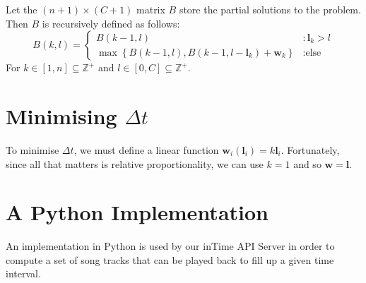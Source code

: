 \documentclass[11pt]{article}
\begin{document}
Let the $(n+1) \times (C+1)$ matrix $B$ store the partial solutions to the problem. Then $B$ is recursively defined as follows:
\[
  B(k, l) = \begin{cases}
            B(k-1, l) &: \mathbf{l}_{k} > l \\
            \max \left\{{B(k-1,l), B(k-1, l - \mathbf{l}_{k}) + \mathbf{w}_{k}}\right\} &: \text{else}
            \end{cases}
\]
For $k \in [1,n] \subseteq \mathbb{Z}^{+}$ and $l \in [0,C] \subseteq \mathbb{Z}^{+}$.

\section*{Minimising $\Delta t$}

To minimise $\Delta t$, we must define a linear function $\mathbf{w}_{i}(\mathbf{l}_{i}) = k\mathbf{l}_{i}$. Fortunately, since all that matters is relative proportionality, we can use $k = 1$ and so $\mathbf{w} = \mathbf{l}$.

\section*{A Python Implementation}

An implementation in Python is used by our inTime API Server in order to compute a set of song tracks that can be played back to fill up a given time interval.
\end{document}
